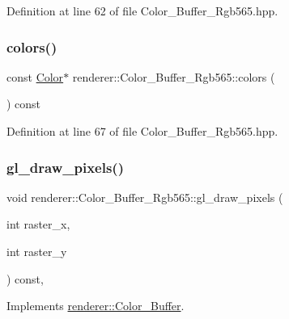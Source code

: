 Definition at line 62 of file Color\+\_\+\+Buffer\+\_\+\+Rgb565.\+hpp.

\mbox{\label{classrenderer_1_1_color___buffer___rgb565_acf5016c64a12241e770a149dc1793fce}} 
\subsubsection{\texorpdfstring{colors()}{colors()}\hspace{0.1cm}{\footnotesize\ttfamily [2/2]}}
{\footnotesize\ttfamily const \mbox{\hyperlink{structrenderer_1_1_color___buffer___rgb565_1_1_color}{Color}}$\ast$ renderer\+::\+Color\+\_\+\+Buffer\+\_\+\+Rgb565\+::colors (\begin{DoxyParamCaption}{ }\end{DoxyParamCaption}) const\hspace{0.3cm}{\ttfamily [inline]}}



Definition at line 67 of file Color\+\_\+\+Buffer\+\_\+\+Rgb565.\+hpp.

\mbox{\label{classrenderer_1_1_color___buffer___rgb565_a8e9e5e0646c4ac90e4867e8f83352eaa}} 
\subsubsection{\texorpdfstring{gl\_draw\_pixels()}{gl\_draw\_pixels()}}
{\footnotesize\ttfamily void renderer\+::\+Color\+\_\+\+Buffer\+\_\+\+Rgb565\+::gl\+\_\+draw\+\_\+pixels (\begin{DoxyParamCaption}\item[{int}]{raster\+\_\+x,  }\item[{int}]{raster\+\_\+y }\end{DoxyParamCaption}) const\hspace{0.3cm}{\ttfamily [inline]}, {\ttfamily [virtual]}}



Implements \mbox{\hyperlink{classrenderer_1_1_color___buffer_a1108142247a2814d028b5ffbcde72d52}{renderer\+::\+Color\+\_\+\+Buffer}}.




